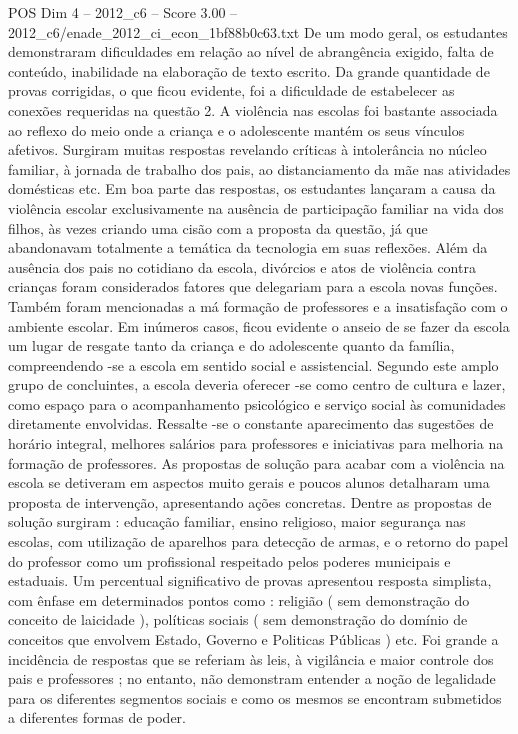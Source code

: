 \begin{textsample}{POS Dim 4 – 2012\_c6 – Score 3.00 – 2012\_c6/enade\_2012\_ci\_econ\_1bf88b0c63.txt}
De um modo geral, os estudantes demonstraram dificuldades em relação ao nível de abrangência exigido, falta de conteúdo, inabilidade na elaboração de texto escrito.
Da grande quantidade de provas corrigidas, o que ficou evidente, foi a dificuldade de estabelecer as conexões requeridas na questão 2.
A violência nas escolas foi bastante associada ao reflexo do meio onde a criança e o adolescente mantém os seus vínculos afetivos.
Surgiram muitas respostas revelando críticas à intolerância no núcleo familiar, à jornada de trabalho dos pais, ao distanciamento da mãe nas atividades domésticas etc.
Em boa parte das respostas, os estudantes lançaram a causa da violência escolar exclusivamente na ausência de participação familiar na vida dos filhos, às vezes criando uma cisão com a proposta da questão, já que abandonavam totalmente a temática da tecnologia em suas reflexões.
Além da ausência dos pais no cotidiano da escola, divórcios e atos de violência contra crianças foram considerados fatores que delegariam para a escola novas funções.
Também foram mencionadas a má formação de professores e a insatisfação com o ambiente escolar.
Em inúmeros casos, ficou evidente o anseio de se fazer da escola um lugar de resgate tanto da criança e do adolescente quanto da família, compreendendo -se a escola em sentido social e assistencial.
Segundo este amplo grupo de concluintes, a escola deveria oferecer -se como centro de cultura e lazer, como espaço para o acompanhamento psicológico e serviço social às comunidades diretamente envolvidas.
Ressalte -se o constante aparecimento das sugestões de horário integral, melhores salários para professores e iniciativas para melhoria na formação de professores.
As propostas de solução para acabar com a violência na escola se detiveram em aspectos muito gerais e poucos alunos detalharam uma proposta de intervenção, apresentando ações concretas.
Dentre as propostas de solução surgiram : educação familiar, ensino religioso, maior segurança nas escolas, com utilização de aparelhos para detecção de armas, e o retorno do papel do professor como um profissional respeitado pelos poderes municipais e estaduais.
Um percentual significativo de provas apresentou resposta simplista, com ênfase em determinados pontos como : religião ( sem demonstração do conceito de laicidade ), políticas sociais ( sem demonstração do domínio de conceitos que envolvem Estado, Governo e Politicas Públicas ) etc.
Foi grande a incidência de respostas que se referiam às leis, à vigilância e maior controle dos pais e professores ; no entanto, não demonstram entender a noção de legalidade para os diferentes segmentos sociais e como os mesmos se encontram submetidos a diferentes formas de poder.

\end{textsample}

